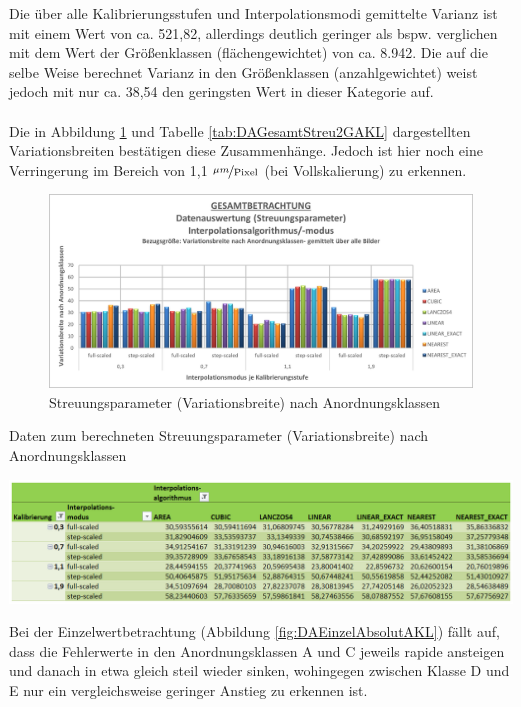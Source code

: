 \documentclass[
fontsize=10pt, 
listof = totoc,
parskip = half	
]{report}
\begin{document}
\noindent Die über alle Kalibrierungsstufen und Interpolationsmodi gemittelte Varianz ist mit einem Wert von ca. 521,82, allerdings deutlich geringer als bspw. verglichen mit dem Wert der Größenklassen (flächengewichtet) von ca. 8.942. Die auf die selbe Weise berechnet Varianz in den Größenklassen (anzahlgewichtet) weist jedoch mit nur ca. 38,54 den geringsten Wert in dieser Kategorie auf. 
\\\\
\noindent Die in Abbildung \ref{fig:DAGesamtStreu2AKL} und Tabelle \ref{tab:DAGesamtStreu2GAKL} dargestellten Variationsbreiten bestätigen diese Zusammenhänge. Jedoch ist hier noch eine Verringerung im Bereich von 1,1 $\nicefrac{\mu m}{\text{Pixel}}$ (bei Vollskalierung) zu erkennen.

\begin{figure}[H]
	\centering
	\includegraphics[width=\textwidth, height=\textheight, keepaspectratio]{pics/DA_Gesamt_Streu2_AKL}
	\caption{Streuungsparameter (Variationsbreite) nach Anordnungsklassen}
	\label{fig:DAGesamtStreu2AKL}
\end{figure}

\begin{table}[H]
	\caption{Daten zum berechneten Streuungsparameter (Variationsbreite) nach Anordnungsklassen}
	\centering
	\includegraphics[width=\textwidth, height=\textheight, keepaspectratio]{pics/Tab_DA_Gesamt_Streu2_AKL}
	\label{tab:DAGesamtStreu2GAKL}
\end{table}

\noindent Bei der Einzelwertbetrachtung (Abbildung \ref{fig:DAEinzelAbsolutAKL}) fällt auf, dass die Fehlerwerte in den Anordnungsklassen A und C jeweils rapide ansteigen und danach in etwa gleich steil wieder sinken, wohingegen zwischen Klasse D und E nur ein vergleichsweise geringer Anstieg zu erkennen ist.
\end{document}
